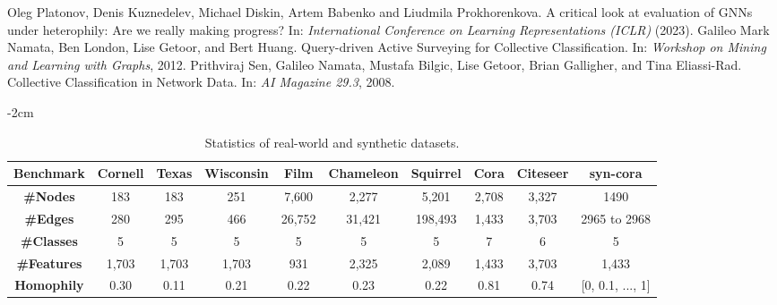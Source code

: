 \documentclass[conference]{IEEEtran}
\begin{document}
\begin{thebibliography}{00}
Oleg Platonov, Denis Kuznedelev, Michael Diskin, Artem Babenko and Liudmila Prokhorenkova. A critical look at evaluation of GNNs under heterophily: Are we really making progress? In: \textit{International Conference on Learning Representations (ICLR)} (2023).
Galileo Mark Namata, Ben London, Lise Getoor, and Bert Huang. Query-driven Active Surveying for Collective Classification. In: \textit{Workshop on Mining and Learning with Graphs}, 2012.
Prithviraj Sen, Galileo Namata, Mustafa Bilgic, Lise Getoor, Brian Galligher, and Tina Eliassi-Rad. Collective Classification in Network Data. In: \textit{AI Magazine 29.3}, 2008.
\end{thebibliography}

\appendices

\vspace{6cm}

\begin{table*}[t]
    \centering
    \footnotesize
    \addtolength{\leftskip} {-2cm}
    \addtolength{\rightskip}{-2cm}
\begin{tabular}{c c c c c c c c c c }
    \toprule
    \textbf{Benchmark} & \textbf{Cornell} & \textbf{Texas} & \textbf{Wisconsin} & \textbf{Film} & \textbf{Chameleon} & \textbf{Squirrel} & \textbf{Cora} & \textbf{Citeseer} & \textbf{syn-cora} \\
    \midrule
    \textbf{\#Nodes} & 183 & 183 & 251 & 7,600 & 2,277 & 5,201 & 2,708 & 3,327 & 1490 \\
    \textbf{\#Edges} & 280 & 295 & 466 & 26,752 & 31,421 & 198,493 & 1,433 & 3,703 & 2965 to 2968 \\
    \textbf{\#Classes} & 5 & 5 & 5 & 5 & 5 & 5 & 7 & 6 & 5 \\
    \textbf{\#Features} & 1,703 & 1,703 & 1,703 & 931 & 2,325 & 2,089 & 1,433 & 3,703 & 1,433 \\
    \textbf{Homophily } & 0.30 & 0.11 & 0.21 & 0.22 & 0.23 & 0.22 & 0.81 & 0.74 & [0, 0.1, ..., 1] \\
    \bottomrule

    \end{tabular}
    \caption{Statistics of real-world and synthetic datasets.}
    \label{tab:data_stat}

\end{table*}
\end{document}

